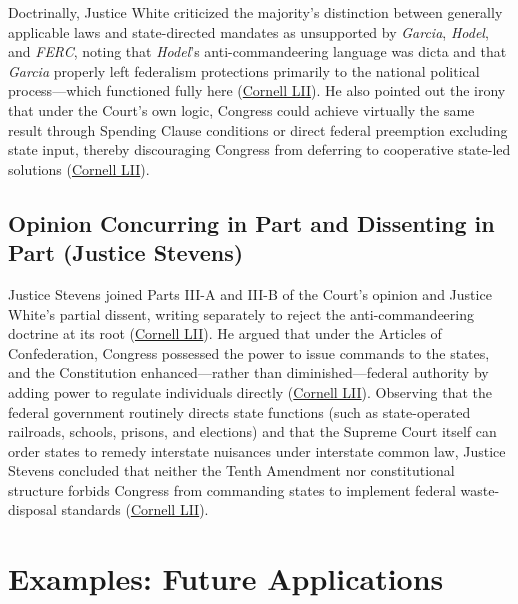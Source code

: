 \documentclass[12pt]{article}
\begin{document}
Doctrinally, Justice White criticized the majority's distinction between generally applicable laws and state-directed mandates as unsupported by \textit{Garcia}, \textit{Hodel}, and \textit{FERC}, noting that \textit{Hodel}'s anti-commandeering language was dicta and that \textit{Garcia} properly left federalism protections primarily to the national political process---which functioned fully here (\href{https://www.law.cornell.edu/supremecourt/text/505/144}{Cornell LII}). He also pointed out the irony that under the Court's own logic, Congress could achieve virtually the same result through Spending Clause conditions or direct federal preemption excluding state input, thereby discouraging Congress from deferring to cooperative state-led solutions (\href{https://www.law.cornell.edu/supremecourt/text/505/144}{Cornell LII}).

\subsection{Opinion Concurring in Part and Dissenting in Part (Justice Stevens)}

Justice Stevens joined Parts III-A and III-B of the Court's opinion and Justice White's partial dissent, writing separately to reject the anti-commandeering doctrine at its root (\href{https://www.law.cornell.edu/supremecourt/text/505/144}{Cornell LII}). He argued that under the Articles of Confederation, Congress possessed the power to issue commands to the states, and the Constitution enhanced---rather than diminished---federal authority by adding power to regulate individuals directly (\href{https://www.law.cornell.edu/supremecourt/text/505/144}{Cornell LII}). Observing that the federal government routinely directs state functions (such as state-operated railroads, schools, prisons, and elections) and that the Supreme Court itself can order states to remedy interstate nuisances under interstate common law, Justice Stevens concluded that neither the Tenth Amendment nor constitutional structure forbids Congress from commanding states to implement federal waste-disposal standards (\href{https://www.law.cornell.edu/supremecourt/text/505/144}{Cornell LII}).

\section{Examples: Future Applications}
\end{document}
